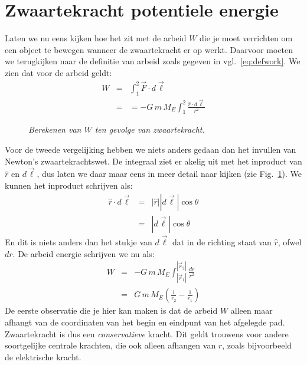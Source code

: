 \section{Zwaartekracht potentiele energie}

Laten we nu eens kijken hoe het zit met de arbeid $W$ die je moet verrichten om een object te bewegen
wanneer de zwaartekracht er op werkt. Daarvoor moeten we terugkijken naar de definitie van arbeid zoals
gegeven in vgl.~\ref{eq:defwork}. We zien dat voor de arbeid geldt:
\begin{eqnarray}
W & = & \int_1^2 \vec{F}\cdot d\vec{\ell}\\
    & = &  = - G\,m\,M_E\int_1^2 \frac{\hat{r}\cdot d\vec{\ell}}{r^2}
\end{eqnarray}
 \begin{figure}[htbp]
\begin{center}
\caption{{\it Berekenen van $W$ ten gevolge van zwaartekracht.}}
\label{fig:NewtonPotentieleEnergie}
\end{center}
\end{figure} 
Voor de tweede vergelijking hebben we niets anders gedaan dan het invullen van Newton's zwaartekrachtswet.
De integraal ziet er akelig uit met het inproduct van $\hat{r}$ en $d\vec{\ell}$, dus laten we daar maar eens 
in meer detail naar kijken (zie Fig.~\ref{fig:NewtonPotentieleEnergie}). We kunnen het inproduct schrijven als:
\begin{eqnarray}
\hat{r} \cdot d\vec{\ell} & = & |\hat{r}||d\vec{\ell}|\cos\theta \\ 
& = & |d\vec{\ell}|\cos\theta
\end{eqnarray}
En dit is niets anders dan het stukje van $d\vec{\ell}$ dat in de richting staat van $\hat{r}$, ofwel $dr$. De arbeid
energie schrijven we nu als:
\begin{eqnarray}
W & = & - G\,m\,M_E \int_{|\vec{r}_1|}^{|\vec{r}_2|} \frac{dr}{r^2} \\
     & = & G\,m\,M_E\left(\frac{1}{r_2}-\frac{1}{r_1}\right)
\end{eqnarray}     
De eerste observatie die je hier kan maken is dat de arbeid $W$ alleen maar afhangt van de coordinaten
van het begin en eindpunt van het afgelegde pad. Zwaartekracht is dus een \emph{conservatieve} kracht. Dit
geldt trouwens voor andere soortgelijke centrale krachten, die ook alleen afhangen van $r$, zoals bijvoorbeeld de
elektrische kracht.

